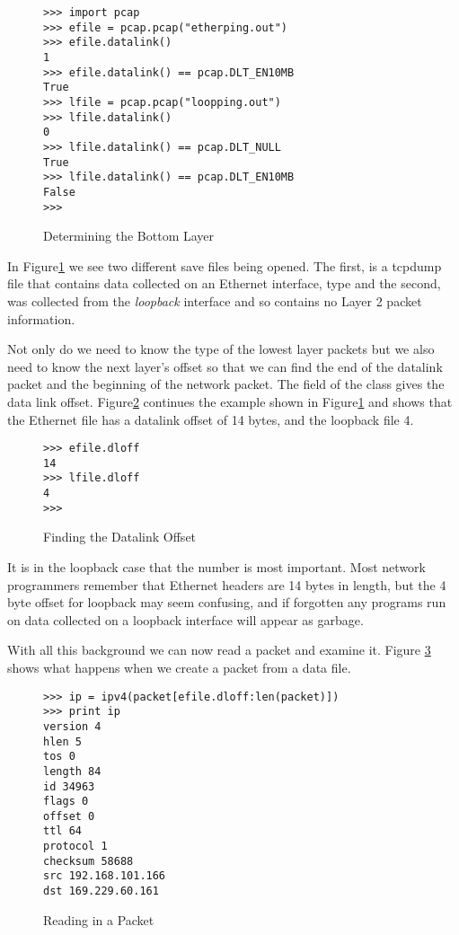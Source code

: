 \documentclass[11pt]{article}
\begin{document}
\begin{figure}
  \centering
\begin{verbatim}
>>> import pcap
>>> efile = pcap.pcap("etherping.out")
>>> efile.datalink()
1
>>> efile.datalink() == pcap.DLT_EN10MB
True
>>> lfile = pcap.pcap("loopping.out")
>>> lfile.datalink()
0
>>> lfile.datalink() == pcap.DLT_NULL
True
>>> lfile.datalink() == pcap.DLT_EN10MB
False
>>> 
\end{verbatim}
  \caption{Determining the Bottom Layer}
  \label{fig:determining-the-bottom-layer}
\end{figure}

In Figure\ref{fig:determining-the-bottom-layer} we see two different
save files being opened.  The first,  is a tcpdump
file that contains data collected on an Ethernet interface, type
 and the second,  was collected
from the \emph{loopback} interface and so contains no Layer 2 packet
information.  

Not only do we need to know the type of the lowest layer packets but
we also need to know the next layer's offset so that we can find the
end of the datalink packet and the beginning of the network packet.
The  field of the  class gives the data link
offset.  Figure\ref{fig:finding-the-datalink-offset} continues the
example shown in Figure\ref{fig:determining-the-bottom-layer} and
shows that the Ethernet file has a datalink offset of 14 bytes, and
the loopback file 4. 

  \begin{figure}
    \centering
\begin{verbatim}
>>> efile.dloff
14
>>> lfile.dloff
4
>>> 
\end{verbatim}
    \caption{Finding the Datalink Offset}
    \label{fig:finding-the-datalink-offset}
  \end{figure}

It is in the loopback case that the number is most important.  Most
network programmers remember that Ethernet headers are 14 bytes in
length, but the 4 byte offset for loopback may seem confusing, and if
forgotten any programs run on data collected on a loopback interface
will appear as garbage.

With all this background we can now read a packet and examine it.
Figure \ref{fig:reading-in-a-packet} shows what happens when we create
a packet from a data file.  

\begin{figure}
  \centering
\begin{verbatim}
>>> ip = ipv4(packet[efile.dloff:len(packet)])
>>> print ip
version 4
hlen 5
tos 0
length 84
id 34963
flags 0
offset 0
ttl 64
protocol 1
checksum 58688
src 192.168.101.166
dst 169.229.60.161
\end{verbatim}
  \caption{Reading in a Packet}
  \label{fig:reading-in-a-packet}
\end{figure}
\end{document}
